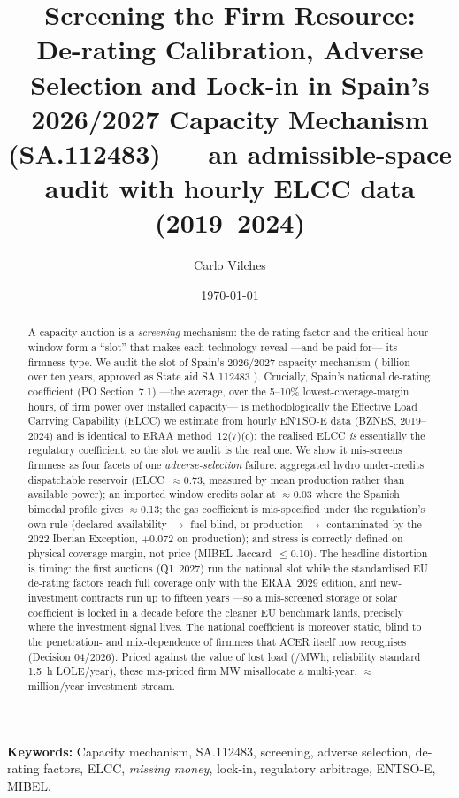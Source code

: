 \documentclass[11pt,a4paper]{article}
\title{\textbf{Screening the Firm Resource:}\\
       \large De-rating Calibration, Adverse Selection and Lock-in in Spain's
       2026/2027 Capacity Mechanism (SA.112483) --- an admissible-space audit
       with hourly ELCC data (2019--2024)}
\author{Carlo Vilches}
\affil{Universitat de Barcelona\\
       \texttt{cvilchce15@alumnes.ub.edu}}
\date{\today}
\begin{document}
\maketitle

\begin{abstract}
\noindent
A capacity auction is a \emph{screening} mechanism: the de-rating factor and the
critical-hour window form a ``slot'' that makes each technology reveal ---and be paid
for--- its firmness type. We audit the slot of Spain's 2026/2027 capacity mechanism
( billion over ten years, approved as State aid SA.112483
\citep{ec2026sa112483}). Crucially, Spain's national de-rating
coefficient (PO Section~7.1) ---the average, over the 5--10\% lowest-coverage-margin
hours, of firm power over installed capacity--- is methodologically the Effective Load
Carrying Capability (ELCC) we estimate from hourly ENTSO-E data (BZN\textbar ES,
2019--2024) and is identical to ERAA method~12(7)(c): the realised ELCC \emph{is}
essentially the regulatory coefficient, so the slot we audit is the real one. We show
it mis-screens firmness as four facets of one \emph{adverse-selection} failure:
aggregated hydro under-credits dispatchable reservoir (ELCC~$\approx$0.73, measured by
mean production rather than available power); an imported window credits solar at
$\approx$0.03 where the Spanish bimodal profile gives $\approx$0.13; the gas
coefficient is mis-specified under the regulation's own rule (declared availability
$\to$ fuel-blind, or production $\to$ contaminated by the 2022 Iberian Exception,
$+0.072$ on production); and stress is correctly defined on physical coverage margin,
not price (MIBEL Jaccard~$\leq$0.10). The headline distortion is timing: the first
auctions (Q1~2027) run the national slot while the standardised EU de-rating factors
reach full coverage only with the ERAA~2029 edition, and new-investment contracts run
up to fifteen years ---so a mis-screened storage or solar coefficient is locked in a
decade before the cleaner EU benchmark lands, precisely where the investment signal
lives. The national coefficient is moreover static, blind to the penetration- and
mix-dependence of firmness that ACER itself now recognises (Decision 04/2026). Priced
against the value of lost load (/MWh; reliability standard 1.5~h
LOLE/year), these mis-priced firm MW misallocate a multi-year, $\approx$
million/year investment stream.
\end{abstract}

\textbf{Keywords:} Capacity mechanism, SA.112483, screening, adverse selection,
de-rating factors, ELCC, \emph{missing money}, lock-in, regulatory arbitrage,
ENTSO-E, MIBEL.
\end{document}
